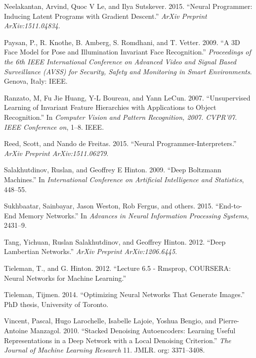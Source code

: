 \documentclass[12pt,twoside]{mitthesis}
\begin{document}
\hypertarget{ref-neelakantan2015neural}{}
Neelakantan, Arvind, Quoc V Le, and Ilya Sutskever. 2015. ``Neural
Programmer: Inducing Latent Programs with Gradient Descent.''
\emph{ArXiv Preprint ArXiv:1511.04834}.

\hypertarget{ref-paysan2009face}{}
Paysan, P., R. Knothe, B. Amberg, S. Romdhani, and T. Vetter. 2009. ``A
3D Face Model for Pose and Illumination Invariant Face Recognition.''
\emph{Proceedings of the 6th IEEE International Conference on Advanced
Video and Signal Based Surveillance (AVSS) for Security, Safety and
Monitoring in Smart Environments}. Genova, Italy: IEEE.

\hypertarget{ref-ranzato2007unsupervised}{}
Ranzato, M, Fu Jie Huang, Y-L Boureau, and Yann LeCun. 2007.
``Unsupervised Learning of Invariant Feature Hierarchies with
Applications to Object Recognition.'' In \emph{Computer Vision and
Pattern Recognition, 2007. CVPR'07. IEEE Conference on}, 1--8. IEEE.

\hypertarget{ref-reed2015neural}{}
Reed, Scott, and Nando de Freitas. 2015. ``Neural
Programmer-Interpreters.'' \emph{ArXiv Preprint ArXiv:1511.06279}.

\hypertarget{ref-salakhutdinov2009deep}{}
Salakhutdinov, Ruslan, and Geoffrey E Hinton. 2009. ``Deep Boltzmann
Machines.'' In \emph{International Conference on Artificial Intelligence
and Statistics}, 448--55.

\hypertarget{ref-sukhbaatar2015end}{}
Sukhbaatar, Sainbayar, Jason Weston, Rob Fergus, and others. 2015.
``End-to-End Memory Networks.'' In \emph{Advances in Neural Information
Processing Systems}, 2431--9.

\hypertarget{ref-tang2012deep}{}
Tang, Yichuan, Ruslan Salakhutdinov, and Geoffrey Hinton. 2012. ``Deep
Lambertian Networks.'' \emph{ArXiv Preprint ArXiv:1206.6445}.

\hypertarget{ref-rmsprop}{}
Tieleman, T., and G. Hinton. 2012. ``Lecture 6.5 - Rmsprop, COURSERA:
Neural Networks for Machine Learning.''

\hypertarget{ref-tieleman2014optimizing}{}
Tieleman, Tijmen. 2014. ``Optimizing Neural Networks That Generate
Images.'' PhD thesis, University of Toronto.

\hypertarget{ref-vincent2010stacked}{}
Vincent, Pascal, Hugo Larochelle, Isabelle Lajoie, Yoshua Bengio, and
Pierre-Antoine Manzagol. 2010. ``Stacked Denoising Autoencoders:
Learning Useful Representations in a Deep Network with a Local Denoising
Criterion.'' \emph{The Journal of Machine Learning Research} 11. JMLR.
org: 3371--3408.
\end{document}
